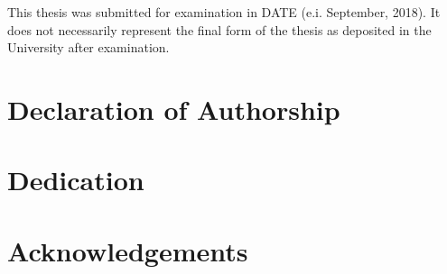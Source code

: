 \documentclass[11pt]{report}
\begin{document}


\newpage
	\begin{center}
	\thispagestyle{empty}
	\vspace*{\fill}
	This thesis was submitted for examination in DATE (e.i. September, 2018). It does not necessarily represent the final form of the thesis as deposited in the University after examination.
	\vspace*{\fill}
	\end{center}
\newpage



\chapter*{Declaration of Authorship}


\chapter*{Dedication}


\chapter*{Acknowledgements}

\newpage


{}
\tableofcontents
\newpage

{} 
\listoffigures
\newpage

{} 
\listoftables
\newpage

\end{document}
